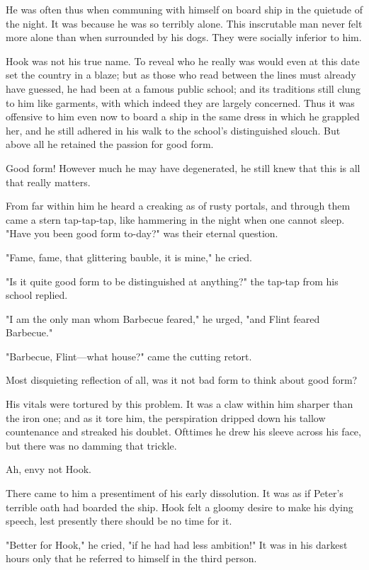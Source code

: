 He was often thus when communing with himself on board ship in the
quietude of the night. It was because he was so terribly alone. This
inscrutable man never felt more alone than when surrounded by his dogs.
They were socially inferior to him.


Hook was not his true name. To reveal who he really was would even at this
date set the country in a blaze; but as those who read between the lines
must already have guessed, he had been at a famous public school; and its
traditions still clung to him like garments, with which indeed they are
largely concerned. Thus it was offensive to him even now to board a ship
in the same dress in which he grappled her, and he still
adhered in his walk to the school's distinguished slouch. But above all he
retained the passion for good form.


Good form! However much he may have degenerated, he still knew that this
is all that really matters.


From far within him he heard a creaking as of rusty portals, and through
them came a stern tap-tap-tap, like hammering in the night when one cannot
sleep. "Have you been good form to-day?" was their eternal question.


"Fame, fame, that glittering bauble, it is mine," he cried.


"Is it quite good form to be distinguished at anything?" the tap-tap from
his school replied.


"I am the only man whom Barbecue feared," he urged, "and Flint feared
Barbecue."


"Barbecue, Flint—what house?" came the cutting retort.


Most disquieting reflection of all, was it not bad form to think about
good form?


His vitals were tortured by this problem. It was a claw within him sharper
than the iron one; and as it tore him, the perspiration dripped down his
tallow countenance and streaked his doublet. Ofttimes he drew his
sleeve across his face, but there was no damming that trickle.


Ah, envy not Hook.


There came to him a presentiment of his early dissolution. It was
as if Peter's terrible oath had boarded the ship. Hook felt a gloomy
desire to make his dying speech, lest presently there should be no time
for it.


"Better for Hook," he cried, "if he had had less ambition!" It was in his
darkest hours only that he referred to himself in the third person.


